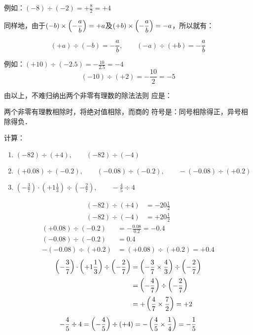 例如：$(-8)\div (-2)=+\frac{8}{2}=+4$

同样地，由于$(-b)\times \left(-\dfrac{a}{b}\right)=+a$及$(+b)\times \left(-\dfrac{a}{b}\right)=-a$，所以就有：

\[(+a)\div (-b)=-\frac{a}{b},\qquad   (-a)\div (+b)=-\frac{a}{b}\]

例如：$(+10)\div (-2.5)=-\frac{10}{2.5}=-4$
\[(-10)\div (+2)=-\frac{10}{2}=-5 \]

由以上，不难归纳出两个非零有理数的除法法则
应是：

\begin{blk}{}
	两个非零有理教相除时，将绝对值相除，而商的
	符号是：同号相除得正，异号相除得负．
\end{blk}

\begin{example}
	计算：
	\begin{enumerate}
		\item $(-82)\div (+4),\qquad (-82)\div (-4)$
		\item $(+0.08)\div (-0.2),\qquad (-0.08)\div (-0.2),\qquad -(-0.08)\div (+0.2)$
		\item $\left(-\frac{3}{7}\right)\cdot \left(+1\frac{1}{3}\right)\div \left(-\frac{2}{7}\right),\qquad -\frac{4}{5}\div 4$
	\end{enumerate}
\end{example}

\begin{solution}
	\[\begin{split}
	(-82)\div (+4)&=-20\frac{1}{2}\\
	(-82)\div (-4)&=+20\frac{1}{2}
	\end{split}\]
	\[\begin{split}
	(+0.08)\div (-0.2)&=-\frac{0.08}{0.2}=-0.4\\
	(-0.08)\div (-0.2)&=0.4\\
	-(-0.08)\div (+0.2)&=(+0.08)\div (+0.2)=+0.4
	\end{split}\]
	\[\begin{split}
	\left(-\dfrac{3}{7}\right)\cdot \left(+1\dfrac{1}{3}\right)\div \left(-\dfrac{2}{7}\right)&= \left(-\dfrac{3}{7}\times\dfrac{4}{3}\right) \div \left(-\dfrac{2}{7}\right)\\
	&=\left(-\dfrac{4}{7}\right)\div \left(-\dfrac{2}{7}\right)\\
	&=+\left(\dfrac{4}{7}\times\dfrac{7}{2}\right)=+2
	\end{split}\]
	\[-\dfrac{4}{5}\div 4=\left(-\dfrac{4}{5}\right)\div (+4)=-\left(\dfrac{4}{5}\times\dfrac{1}{4}\right)=-\dfrac{1}{5} \]
\end{solution}

